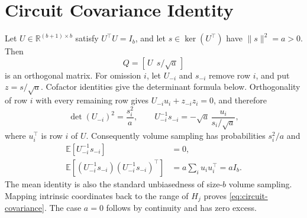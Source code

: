 \documentclass[twoside]{article}
\newcommand{\R}{\mathbb R}
\newcommand{\E}{\mathbb E}
\begin{document}
\section{Circuit Covariance Identity}

Let $U\in\R^{(b+1)\times b}$ satisfy $U^\top U=I_b$, and let $s\in\ker(U^\top)$ have $\|s\|^2=a>0$. Then
\begin{equation}
 Q=[\,U\ \ s/\sqrt a\,]
\end{equation}
is an orthogonal matrix. For omission $i$, let $U_{-i}$ and $s_{-i}$ remove row $i$, and put $z=s/\sqrt a$. Cofactor identities give the determinant formula below. Orthogonality of row $i$ with every remaining row gives $U_{-i}u_i+z_{-i}z_i=0$, and therefore
\begin{equation}
 \det(U_{-i})^2=\frac{s_i^2}{a},\qquad
 U_{-i}^{-1}s_{-i}=-\sqrt a\,\frac{u_i}{s_i/\sqrt a},
 \label{eq:cofactor}
\end{equation}
where $u_i^\top$ is row $i$ of $U$. Consequently volume sampling has probabilities $s_i^2/a$ and
\begin{align}
 \E[U_{-i}^{-1}s_{-i}]&=0,\\
 \E[(U_{-i}^{-1}s_{-i})(U_{-i}^{-1}s_{-i})^\top]
 &=a\sum_i u_iu_i^\top=aI_b.
\end{align}
The mean identity is also the standard unbiasedness of size-$b$ volume sampling. Mapping intrinsic coordinates back to the range of $H_j$ proves \eqref{eq:circuit-covariance}. The case $a=0$ follows by continuity and has zero excess.
\end{document}
